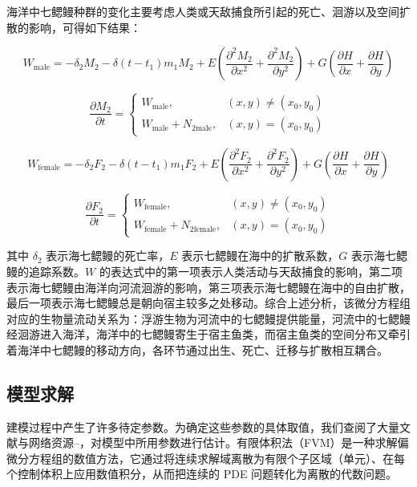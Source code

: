 \documentclass[11pt,a4paper]{ctexart}
\begin{document}
海洋中七鳃鳗种群的变化主要考虑人类或天敌捕食所引起的死亡、洄游以及空间扩散的影响，可得如下结果：

\begin{equation}
W_{\mathrm{male}}=-\delta_2 M_2-\delta(t-t_1)m_1M_2+E\left(\frac{\partial^2 M_2}{\partial x^2}+\frac{\partial^2 M_2}{\partial y^2}\right)+G\left(\frac{\partial H}{\partial x}+\frac{\partial H}{\partial y}\right)
\end{equation}

\begin{equation}
\frac{\partial M_2}{\partial t}=
\begin{cases}
W_{\mathrm{male}}, & (x,y)\neq(x_0,y_0)\\
W_{\mathrm{male}}+N_{2\mathrm{male}}, & (x,y)=(x_0,y_0)
\end{cases}
\end{equation}

\begin{equation}
W_{\mathrm{female}}=-\delta_2 F_2-\delta(t-t_1)m_1F_2+E\left(\frac{\partial^2 F_2}{\partial x^2}+\frac{\partial^2 F_2}{\partial y^2}\right)+G\left(\frac{\partial H}{\partial x}+\frac{\partial H}{\partial y}\right)
\end{equation}

\begin{equation}
\frac{\partial F_2}{\partial t}=
\begin{cases}
W_{\mathrm{female}}, & (x,y)\neq(x_0,y_0)\\
W_{\mathrm{female}}+N_{2\mathrm{female}}, & (x,y)=(x_0,y_0)
\end{cases}
\end{equation}

其中 $\delta_2$ 表示海七鳃鳗的死亡率，$E$ 表示七鳃鳗在海中的扩散系数，$G$ 表示海七鳃鳗的追踪系数。$W$ 的表达式中的第一项表示人类活动与天敌捕食的影响，第二项表示海七鳃鳗由海洋向河流洄游的影响，第三项表示海七鳃鳗在海中的自由扩散，最后一项表示海七鳃鳗总是朝向宿主较多之处移动。综合上述分析，该微分方程组对应的生物量流动关系为：浮游生物为河流中的七鳃鳗提供能量，河流中的七鳃鳗经洄游进入海洋，海洋中的七鳃鳗寄生于宿主鱼类，而宿主鱼类的空间分布又牵引着海洋中七鳃鳗的移动方向，各环节通过出生、死亡、迁移与扩散相互耦合。

\subsection{模型求解}

建模过程中产生了许多待定参数。为确定这些参数的具体取值，我们查阅了大量文献与网络资源\cite{13}--\cite{16}，对模型中所用参数进行估计。有限体积法（FVM）是一种求解偏微分方程组的数值方法，它通过将连续求解域离散为有限个子区域（单元）、在每个控制体积上应用数值积分，从而把连续的 PDE 问题转化为离散的代数问题。
\end{document}
